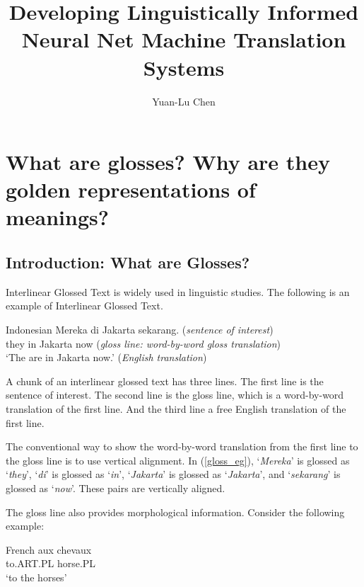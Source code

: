 \documentclass[final]{ua-thesis}
\title{Developing Linguistically Informed Neural Net Machine Translation Systems}
\author{Yuan-Lu Chen}
\begin{document}


\maketitle

\chapter{What are glosses? Why are they golden representations of meanings?}
\label{chap:gloss}

\section{Introduction: What are Glosses?}

Interlinear Glossed Text is widely used in linguistic studies. The following is an example of Interlinear Glossed Text.
\begin{exe}  
\ex\label{gloss_eg} Indonesian \citep[p. 237]{sneddon2012indonesian}
	\gll   Mereka di Jakarta sekarang. (\textit{sentence of interest})\\
     	   they in Jakarta now (\textit{gloss line: word-by-word gloss translation})\\
    \glt   `The are in Jakarta now.' (\textit{English translation})  
\end{exe}

A chunk of an interlinear glossed text has three lines. The first line is the sentence of interest. The second line is the gloss line, which is a word-by-word translation of the first line. And the third line a free English translation of the first line.

The conventional way to show the word-by-word translation from the first line to the gloss line is to use vertical alignment. In (\ref{gloss_eg}), `\textit{Mereka}' is glossed as `\textit{they}', `\textit{di}' is glossed as `\textit{in}', `\textit{Jakarta}' is glossed as `\textit{Jakarta}', and `\textit{sekarang}' is glossed as `\textit{now}'. These pairs are vertically aligned. 

The gloss line also provides morphological information. Consider the following example:

\begin{exe}  
\ex French
	\gll   aux chevaux\\
     	   to.ART.PL horse.PL \\
    \glt   `to the horses'  
\end{exe}
\end{document}
